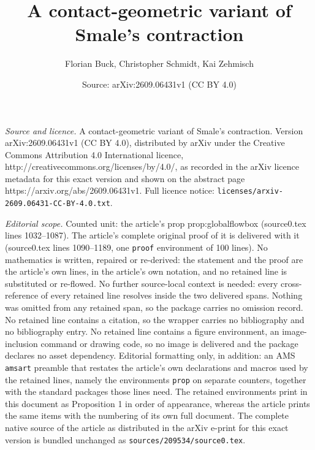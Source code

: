 \documentclass[10pt,a4paper]{amsart}
\title{A contact-geometric variant of Smale's contraction}
\author{Florian Buck, Christopher Schmidt, Kai Zehmisch}
\date{Source: arXiv:2609.06431v1 (CC BY 4.0)}
\begin{document}
\maketitle

\noindent\emph{Source and licence.} A contact-geometric variant of Smale's contraction. Version arXiv:2609.06431v1 (CC BY 4.0), distributed by arXiv under the Creative Commons Attribution 4.0 International licence, http://creativecommons.org/licenses/by/4.0/, as recorded in the arXiv licence metadata for this exact version and shown on the abstract page https://arxiv.org/abs/2609.06431v1. Full licence notice: \texttt{licenses/arxiv-2609.06431-CC-BY-4.0.txt}.\par\smallskip

\noindent\textit{Editorial scope.} Counted unit: the article's prop prop:globalflowbox (source0.tex lines 1032--1087). The article's complete original proof of it is delivered with it (source0.tex lines 1090--1189, one \texttt{proof} environment of 100 lines). No mathematics is written, repaired or re-derived: the statement and the proof are the article's own lines, in the article's own notation, and no retained line is substituted or re-flowed.  No further source-local context is needed: every cross-reference of every retained line resolves inside the two delivered spans.  Nothing was omitted from any retained span, so the package carries no omission record.  No retained line contains a citation, so the wrapper carries no bibliography and no bibliography entry.  No retained line contains a figure environment, an image-inclusion command or drawing code, so no image is delivered and the package declares no asset dependency.  Editorial formatting only, in addition: an AMS \texttt{amsart} preamble that restates the article's own declarations and macros used by the retained lines, namely the environments \texttt{prop} on separate counters, together with the standard packages those lines need.  The retained environments print in this document as Proposition 1 in order of appearance, whereas the article prints the same items with the numbering of its own full document.  The complete native source of the article as distributed in the arXiv e-print for this exact version is bundled unchanged as \texttt{sources/209534/source0.tex}.
\end{document}
